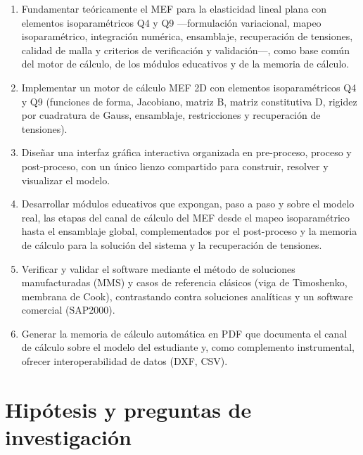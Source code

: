 \begin{enumerate}
    \item Fundamentar teóricamente el MEF para la elasticidad lineal plana con elementos isoparamétricos Q4 y Q9 —formulación variacional, mapeo isoparamétrico, integración numérica, ensamblaje, recuperación de tensiones, calidad de malla y criterios de verificación y validación—, como base común del motor de cálculo, de los módulos educativos y de la memoria de cálculo.
    \item Implementar un motor de cálculo MEF 2D con elementos isoparamétricos Q4 y Q9 (funciones de forma, Jacobiano, matriz B, matriz constitutiva D, rigidez por cuadratura de Gauss, ensamblaje, restricciones y recuperación de tensiones).
    \item Diseñar una interfaz gráfica interactiva organizada en pre-proceso, proceso y post-proceso, con un único lienzo compartido para construir, resolver y visualizar el modelo.
    \item Desarrollar módulos educativos que expongan, paso a paso y sobre el modelo real, las etapas del canal de cálculo del MEF desde el mapeo isoparamétrico hasta el ensamblaje global, complementados por el post-proceso y la memoria de cálculo para la solución del sistema y la recuperación de tensiones.
    \item Verificar y validar el software mediante el método de soluciones manufacturadas (MMS) y casos de referencia clásicos (viga de Timoshenko, membrana de Cook), contrastando contra soluciones analíticas y un software comercial (SAP2000).
    \item Generar la memoria de cálculo automática en PDF que documenta el canal de cálculo sobre el modelo del estudiante y, como complemento instrumental, ofrecer interoperabilidad de datos (DXF, CSV).
\end{enumerate}

\section*{Hipótesis y preguntas de investigación}

